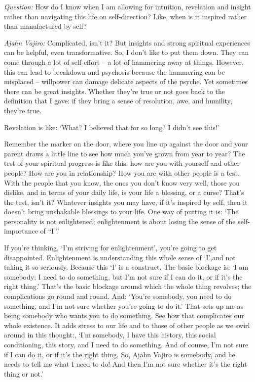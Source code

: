 \clearpage

\emph{Question:} How do I know when I am allowing for intuition, revelation and insight
rather than navigating this life on self-direction? Like, when is it inspired
rather than manufactured by self?

\emph{Ajahn Vajiro:} Complicated, isn't it? But insights and strong spiritual
experiences can be helpful, even transformative. So, I don't like to put them
down. They can come through a lot of self-effort -- a lot of hammering away at
things. However, this can lead to breakdown and psychosis because the hammering
can be misplaced -- willpower can damage delicate aspects of the psyche. Yet
sometimes there can be great insights. Whether they're true or not goes back to
the definition that I gave: if they bring a sense of resolution, awe, and
humility, they're true.

Revelation is like: `What? I believed that for so long? I didn't see this!'

Remember the marker on the door, where you line up against the door and your
parent draws a little line to see how much you've grown from year to year? The
test of your spiritual progress is like this: how are you with yourself and
other people? How are you in relationship? How you are with other people is a
test. With the people that you know, the ones you don't know very well, those
you dislike, and in terms of your daily life, is your life a blessing, or a
curse? That's the test, isn't it? Whatever insights you may have, if it's
inspired by self, then it doesn't bring unshakable blessings to your life. One
way of putting it is: `The personality is not enlightened; enlightenment is
about losing the sense of the self-importance of ``I''.'

If you're thinking, `I'm striving for enlightenment', you're going to get
disappointed. Enlightenment is understanding this whole sense of `I',and not
taking it so seriously. Because this `I' is a construct. The basic blockage is:
`I am somebody; I need to do something, but I'm not sure if I can do it, or if
it's the right thing.' That's the basic blockage around which the whole thing
revolves; the complications go round and round. And: `You're somebody, you need
to do something, and I'm not sure whether you're going to do it.' That sets up
me as being somebody who wants you to do something. See how that complicates our
whole existence. It adds stress to our life and to those of other people as we
swirl around in this thought:, `I'm somebody, I have this history, this social
conditioning, this story, and I need to do something. And of course, I'm not
sure if I can do it, or if it's the right thing. So, Ajahn Vajiro is somebody,
and he needs to tell me what I need to do! And then I'm not sure whether it's
the right thing or not.'

